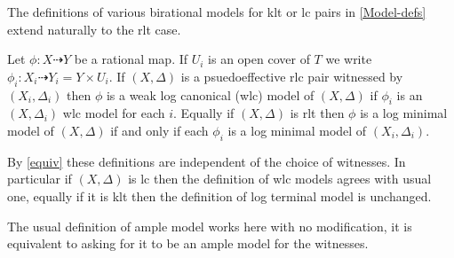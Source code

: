 %		
%		
%		
%		
%		


	The definitions of various birational models for klt or lc pairs in \autoref{Model-defs} extend naturally to the rlt case.

	\begin{definition}
		Let $\phi:X \dashrightarrow Y$ be a rational map. If $U_{i}$ is an open cover of $T$ we write $\phi_{i}:X_{i}\dashrightarrow Y_{i}=Y\times U_{i}$.
		If $(X,\Delta)$ is a psuedoeffective rlc pair witnessed by $(X_{i},\Delta_{i})$ then $\phi$ is a weak log canonical (wlc) model of $(X,\Delta)$ if $\phi_{i}$ is an $(X,\Delta_{i})$ wlc model for each $i$. Equally if $(X,\Delta)$ is rlt then $\phi$ is a log minimal model of $(X,\Delta)$ if and only if each $\phi_{i}$ is a log minimal model of $(X_{i},\Delta_{i})$.
	\end{definition}
	
	By \autoref{equiv} these definitions are independent of the choice of witnesses. In particular if $(X,\Delta)$ is lc then the definition of wlc models agrees with usual one, equally if it is klt then the definition of log terminal model is unchanged.
	
	\begin{remark}
		The usual definition of ample model works here with no modification, it is equivalent to asking for it to be an ample model for the witnesses.
	\end{remark}

